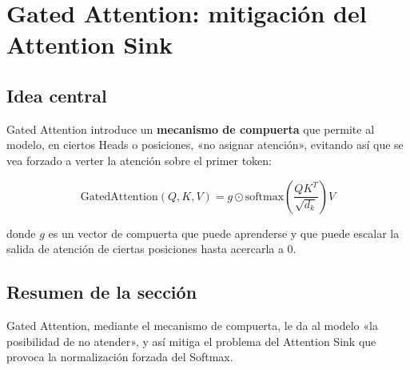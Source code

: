 \section{Gated Attention: mitigación del Attention Sink}

\subsection{Idea central}

Gated Attention introduce un \textbf{mecanismo de compuerta} que permite al modelo, en ciertos Heads o posiciones, «no asignar atención», evitando así que se vea forzado a verter la atención sobre el primer token:

$$
\text{GatedAttention}(Q, K, V) = g \odot \text{softmax}\left(\frac{QK^T}{\sqrt{d_k}}\right) V
$$

donde $g$ es un vector de compuerta que puede aprenderse y que puede escalar la salida de atención de ciertas posiciones hasta acercarla a 0.

\subsection{Resumen de la sección}

Gated Attention, mediante el mecanismo de compuerta, le da al modelo «la posibilidad de no atender», y así mitiga el problema del Attention Sink que provoca la normalización forzada del Softmax.

